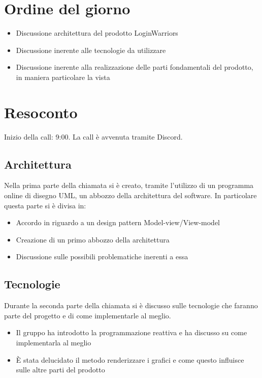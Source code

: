 \section{Ordine del giorno}
\begin{itemize}
	\item Discussione architettura del prodotto LoginWarriors
	\item Discussione inerente alle tecnologie da utilizzare
	\item Discussione inerente alla realizzazione delle parti fondamentali del 
	prodotto, in maniera particolare la vista
\end{itemize}
\section{Resoconto}
Inizio della call: 9:00. \newline
La call è avvenuta tramite Discord.
\subsection{Architettura}
Nella prima parte della chiamata si è creato, tramite l'utilizzo di un programma
online di disegno UML, un abbozzo della architettura del software. \newline
In particolare questa parte si è divisa in:
\begin{itemize}
	\item Accordo in riguardo a un design pattern Model-view/View-model
	\item Creazione di un primo abbozzo della architettura
	\item Discussione sulle possibili problematiche inerenti a essa
\end{itemize}

\subsection{Tecnologie}
Durante la seconda parte della chiamata si è discusso sulle tecnologie che faranno
parte del progetto e di come implementarle al meglio.\newline
\begin{itemize}
	\item Il gruppo ha introdotto la programmazione reattiva e ha discusso su come implementarla al meglio
	\item È stata delucidato il metodo renderizzare i grafici e come questo influisce sulle altre parti del prodotto 
\end{itemize}

